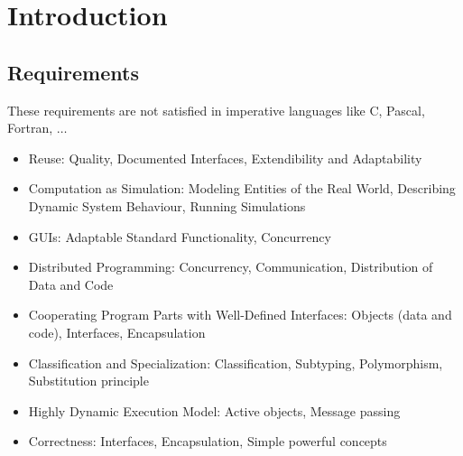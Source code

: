 \section{Introduction}
\subsection{Requirements}
\begin{mytitle} These requirements are not satisfied in imperative languages like C, Pascal, Fortran, $\hdots$ \hfill
    \begin{itemize}
        \item Reuse: Quality, Documented Interfaces, Extendibility and Adaptability
        \item Computation as Simulation: Modeling Entities of the Real World, Describing Dynamic System Behaviour, Running Simulations
        \item GUIs: Adaptable Standard Functionality, Concurrency
        \item Distributed Programming: Concurrency, Communication, Distribution of Data and Code
    \end{itemize}
\end{mytitle}
\begin{mytitle}\hfill
\begin{itemize}
    \item Cooperating Program Parts with Well-Defined Interfaces: Objects (data and code), Interfaces, Encapsulation
    \item Classification and Specialization: Classification, Subtyping, Polymorphism, Substitution principle
    \item Highly Dynamic Execution Model: Active objects, Message passing
    \item Correctness: Interfaces, Encapsulation, Simple powerful concepts
\end{itemize}
\end{mytitle}

